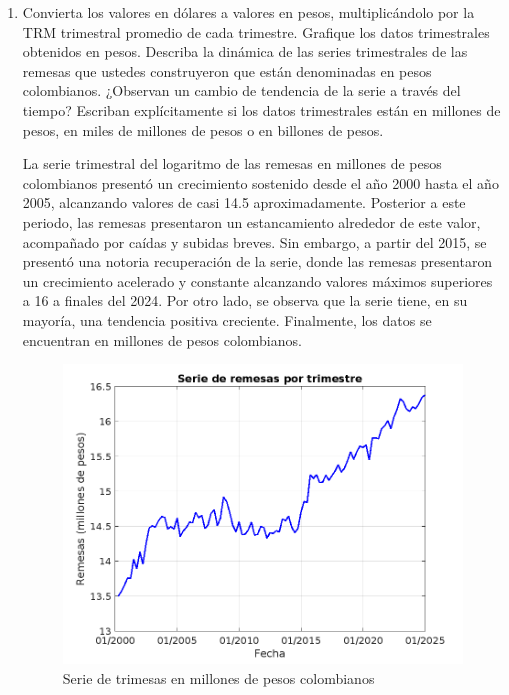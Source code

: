 \documentclass{article}
\theoremstyle{remark}
\theoremstyle{definition}
\begin{document}
\begin{enumerate}[label=\emph{\alph*})]
    \item {Convierta los valores en d\'olares a valores en pesos, multiplic\'andolo por la TRM trimestral promedio de cada trimestre. Grafique los datos trimestrales obtenidos en pesos. Describa la din\'amica de las series trimestrales de las remesas que ustedes construyeron que est\'an denominadas en pesos colombianos. ¿Observan un cambio de tendencia de la serie a trav\'es del tiempo? Escriban expl\'icitamente si los datos trimestrales est\'an en millones de pesos, en miles de millones de pesos o en billones de pesos.}
        \begin{tcolorbox}[title=Soluci\'on 3.a]
        La serie trimestral del logaritmo de las remesas en millones de pesos colombianos presentó un crecimiento sostenido desde el año 2000 hasta el año 2005, alcanzando valores de casi 14.5 aproximadamente. Posterior a este periodo, las remesas presentaron un estancamiento alrededor de este valor, acompañado por caídas y subidas breves. Sin embargo, a partir del 2015, se presentó una notoria recuperación de la serie, donde las remesas presentaron un crecimiento acelerado y constante alcanzando valores máximos superiores a 16 a finales del 2024. Por otro lado, se observa que la serie tiene, en su mayoría, una tendencia positiva creciente. Finalmente, los datos se encuentran en millones de pesos colombianos. 
\begin{figure}[H]
    \centering
    \includegraphics[width=0.5\linewidth]{docs/ln_remesastripesos.png}
    \caption{Serie de trimesas en millones de pesos colombianos}
    \label{fig:enter-label}
\end{figure}


\end{tcolorbox} 


\end{enumerate}
\end{document}
